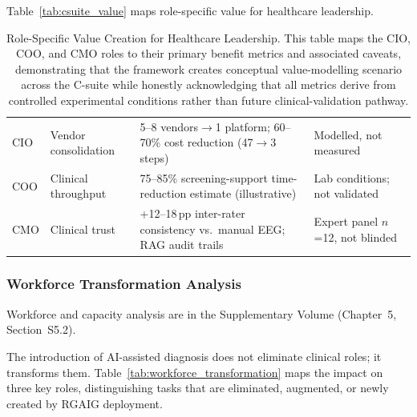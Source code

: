\noindent Table~\ref{tab:csuite_value} maps role-specific value for healthcare leadership.



\begin{table}[H]
\tablestripes\tablefontsize
\caption[Role-Specific Value Creation for Healthcare Leadership]{Role-Specific Value Creation for Healthcare Leadership. This table maps the CIO, COO, and CMO roles to their primary benefit metrics and associated caveats, demonstrating that the framework creates conceptual value-modelling scenario across the C-suite while honestly acknowledging that all metrics derive from controlled experimental conditions rather than future clinical-validation pathway.}
\tablefontsize
\begin{tabularx}{\textwidth}{@{} >{\raggedright\arraybackslash}p{0.8cm} >{\raggedright\arraybackslash}p{1.6cm} L L @{}}
\toprule
{} &  &  &  \\
\midrule
CIO & Vendor consolidation & 5--8 vendors$\to$1 platform; 60--70\% cost reduction (47$\to$3 steps) & Modelled, not measured \\
\addlinespace
COO & Clinical throughput & 75--85\% screening-support time-reduction estimate (illustrative) & Lab conditions; not validated \\
\addlinespace
CMO & Clinical trust & +12--18\,pp inter-rater consistency vs.\ manual EEG; RAG audit trails & Expert panel $n$=12, not blinded \\
\bottomrule
\end{tabularx}
\end{table}

\subsubsection{Workforce Transformation Analysis}

Workforce and capacity analysis are in the Supplementary Volume (Chapter~5, Section~S5.2).

\iffalse
The introduction of AI-assisted diagnosis does not eliminate clinical roles; it transforms them. Table~\ref{tab:workforce_transformation} maps the impact on three key roles, distinguishing tasks that are eliminated, augmented, or newly created by RGAIG deployment.

